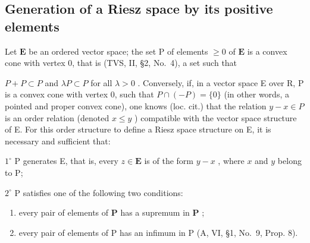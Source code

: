 \subsection{Generation of a Riesz space by its positive elements}

Let \(\mathbf{E}\) be an ordered vector space; the set \(\mathrm{P}\) of elements \(\geqslant 0\) of \(\mathbf{E}\) is a convex cone with vertex 0, that is (TVS, II, §2, No.~4), a set such that

\(P + P \subset P\) and \(\lambda P \subset P\) for all \(\lambda > 0\) . Conversely, if, in a vector space E over R, P is a convex cone with vertex 0, such that \(P \cap (-P) = \{0\}\) (in other words, a pointed and proper convex cone), one knows (loc. cit.) that the relation \(y - x \in P\) is an order relation (denoted \(x \leqslant y\) ) compatible with the vector space structure of E. For this order structure to define a Riesz space structure on E, it is necessary and sufficient that:

\(1^{\circ}\) P generates E, that is, every \(z \in \mathbf{E}\) is of the form \(y - x\) , where \(x\) and \(y\) belong to P;

\(2^{\circ}\) P satisfies one of the following two conditions:

\begin{enumerate}
\def\labelenumi{\alph{enumi})}
\item
  every pair of elements of \(\mathbf{P}\) has a supremum in \(\mathbf{P}\) ;
\item
  every pair of elements of P has an infimum in P (A, VI, §1, No.~9, Prop. 8).
\end{enumerate}

